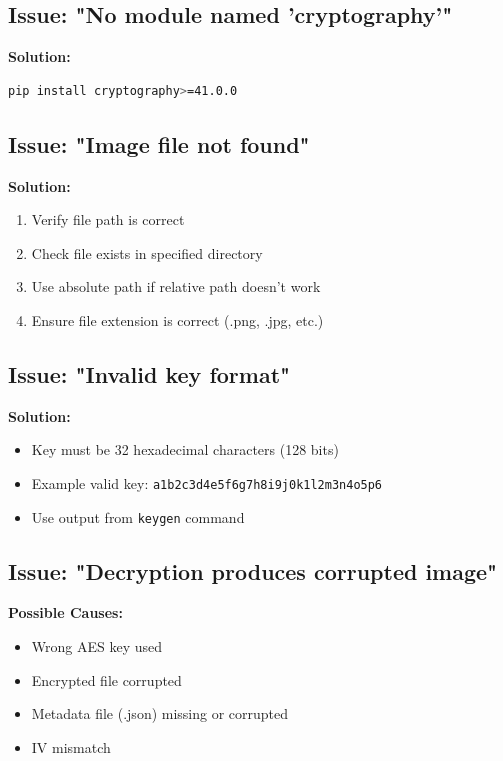 \documentclass[12pt,a4paper]{report}
\begin{document}
\subsection{Issue: "No module named 'cryptography'"}

\textbf{Solution:}
\begin{lstlisting}[language=bash]
pip install cryptography>=41.0.0
\end{lstlisting}

\subsection{Issue: "Image file not found"}

\textbf{Solution:}
\begin{enumerate}
    \item Verify file path is correct
    \item Check file exists in specified directory
    \item Use absolute path if relative path doesn't work
    \item Ensure file extension is correct (.png, .jpg, etc.)
\end{enumerate}

\subsection{Issue: "Invalid key format"}

\textbf{Solution:}
\begin{itemize}
    \item Key must be 32 hexadecimal characters (128 bits)
    \item Example valid key: \texttt{a1b2c3d4e5f6g7h8i9j0k1l2m3n4o5p6}
    \item Use output from \texttt{keygen} command
\end{itemize}

\subsection{Issue: "Decryption produces corrupted image"}

\textbf{Possible Causes:}
\begin{itemize}
    \item Wrong AES key used
    \item Encrypted file corrupted
    \item Metadata file (.json) missing or corrupted
    \item IV mismatch
\end{itemize}
\end{document}

